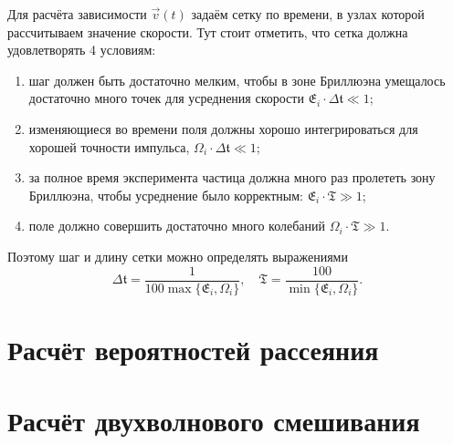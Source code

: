 \documentclass[a4paper]{article}
\begin{document}
    Для расчёта зависимости \( \vec{v}(t) \) задаём сетку по времени, в узлах которой рассчитываем значение скорости. Тут стоит отметить, что сетка должна удовлетворять 4 условиям:
    \begin{enumerate}
        \item шаг должен быть достаточно мелким, чтобы в зоне Бриллюэна умещалось достаточно много точек для усреднения скорости \( \mathfrak{E}_i\cdot\Delta\mathfrak{t} \ll 1 \);
        \item изменяющиеся во времени поля должны хорошо интегрироваться для хорошей точности импульса, \( \Omega_i\cdot\Delta\mathfrak{t} \ll 1 \);
        \item за полное время эксперимента частица должна много раз пролететь зону Бриллюэна, чтобы усреднение было корректным: \( \mathfrak{E}_i\cdot\mathfrak{T} \gg 1 \);
        \item поле должно совершить достаточно много колебаний \( \Omega_i\cdot\mathfrak{T} \gg 1 \).
    \end{enumerate}
    Поэтому шаг и длину сетки можно определять выражениями
    \begin{equation}
        \Delta\mathfrak{t} = \frac{1}{100\max\{\mathfrak{E}_i, \Omega_i\}},\quad \mathfrak{T} = \frac{100}{\min\{\mathfrak{E}_i, \Omega_i\}}.
    \end{equation}
    \section{Расчёт вероятностей рассеяния}
    \section{Расчёт двухволнового смешивания}
\end{document}
